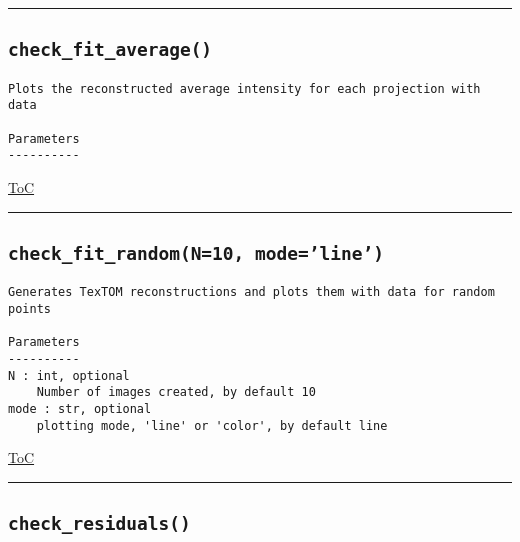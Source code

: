 \documentclass{article}
\begin{document}


\vspace{5mm}

\hrule

\subsection*{\texttt{check\_fit\_average()}}

\begin{lstlisting}[language=docstring]
Plots the reconstructed average intensity for each projection with data

Parameters
----------
\end{lstlisting}

\begin{flushright}

\hyperref[toc]{ToC}

\end{flushright}



\vspace{5mm}

\hrule

\subsection*{\texttt{check\_fit\_random(N=10, mode='line')}}

\begin{lstlisting}[language=docstring]
Generates TexTOM reconstructions and plots them with data for random points

Parameters
----------
N : int, optional
    Number of images created, by default 10    
mode : str, optional
    plotting mode, 'line' or 'color', by default line
\end{lstlisting}

\begin{flushright}

\hyperref[toc]{ToC}

\end{flushright}



\vspace{5mm}

\hrule

\subsection*{\texttt{check\_residuals()}}
\end{document}
